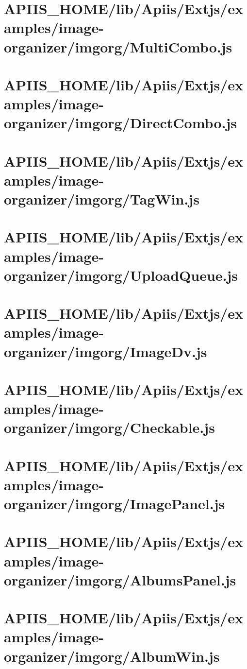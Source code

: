 \section{APIIS\_HOME/lib/Apiis/Extjs/examples/image-organizer/imgorg/MultiCombo.js} 
\section{APIIS\_HOME/lib/Apiis/Extjs/examples/image-organizer/imgorg/DirectCombo.js} 
\section{APIIS\_HOME/lib/Apiis/Extjs/examples/image-organizer/imgorg/TagWin.js} 
\section{APIIS\_HOME/lib/Apiis/Extjs/examples/image-organizer/imgorg/UploadQueue.js} 
\section{APIIS\_HOME/lib/Apiis/Extjs/examples/image-organizer/imgorg/ImageDv.js} 
\section{APIIS\_HOME/lib/Apiis/Extjs/examples/image-organizer/imgorg/Checkable.js} 
\section{APIIS\_HOME/lib/Apiis/Extjs/examples/image-organizer/imgorg/ImagePanel.js} 
\section{APIIS\_HOME/lib/Apiis/Extjs/examples/image-organizer/imgorg/AlbumsPanel.js} 
\section{APIIS\_HOME/lib/Apiis/Extjs/examples/image-organizer/imgorg/AlbumWin.js} 
